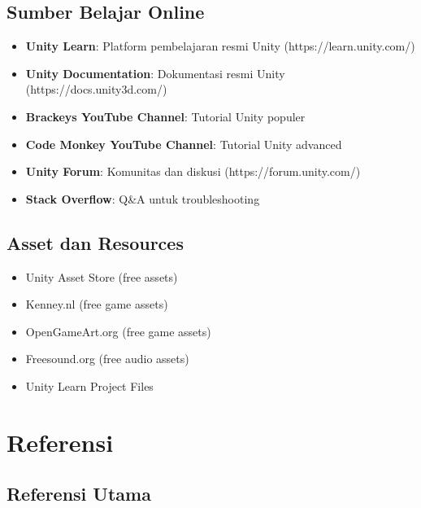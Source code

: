 \documentclass[a4paper,12pt]{article}
\begin{document}
\subsection{Sumber Belajar Online}
\begin{itemize}
\item \textbf{Unity Learn}: Platform pembelajaran resmi Unity (https://learn.unity.com/)
\item \textbf{Unity Documentation}: Dokumentasi resmi Unity (https://docs.unity3d.com/)
\item \textbf{Brackeys YouTube Channel}: Tutorial Unity populer
\item \textbf{Code Monkey YouTube Channel}: Tutorial Unity advanced
\item \textbf{Unity Forum}: Komunitas dan diskusi (https://forum.unity.com/)
\item \textbf{Stack Overflow}: Q\&A untuk troubleshooting
\end{itemize}

\subsection{Asset dan Resources}
\begin{itemize}
\item Unity Asset Store (free assets)
\item Kenney.nl (free game assets)
\item OpenGameArt.org (free game assets)
\item Freesound.org (free audio assets)
\item Unity Learn Project Files
\end{itemize}

\section{Referensi}

\subsection{Referensi Utama}
\end{document}
